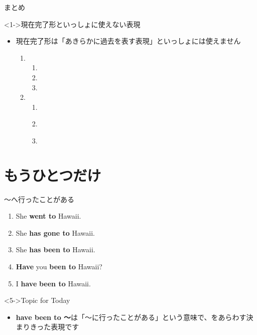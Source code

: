 \documentclass[aspectratio=169,xcolor={dvipsnames,table}]{beamer}
\begin{document}
\begin{frame}[plain]{まとめ}
  \begin{exampleblock}<1->{現在完了形といっしょに使えない表現}
\small

\begin{itemize}
 \item {現在完了形は「あきらかに過去を表す表現」といっしょには使えません\textdbend}
       \begin{enumerate}
	\item \begin{enumerate}
	       \item {}
	       \item {}
	       \item {}
	      \end{enumerate}
	\item \begin{enumerate}
	       \item {}
	       \item {}\\
	       \item {}
	      \end{enumerate}
       \end{enumerate}
\end{itemize}

\end{exampleblock}

\end{frame}
\section{もうひとつだけ}\begin{frame}[plain]{～へ行ったことがある}

\begin{enumerate}
 \item<1-> She \textbf{went to} Hawaii.
 \item<2-> She \textbf{has gone to} Hawaii.
 \item<3-> She \textbf{has been to} Hawaii.
 \item<4-> \textbf{Have} you  \textbf{been to} Hawaii?
 \item<5-> I \textbf{have}  \textbf{been to} Hawaii.
\end{enumerate}

\vfill

\begin{block}<5->{Topic for Today}
\begin{itemize}[square]\small
 \item \textbf{have been to ～}は「～に行ったことがある」という意味で、をあらわす決まりきった表現です
\end{itemize}
\end{block}
\end{frame}
\end{document}
